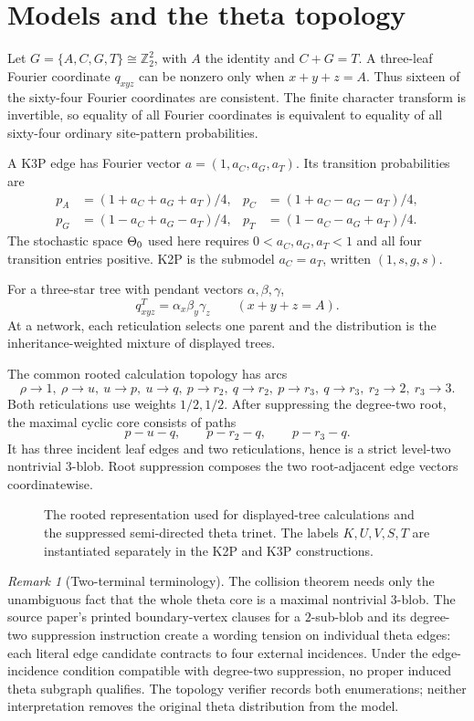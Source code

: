 \documentclass[11pt]{article}
\theoremstyle{remark}\newtheorem{remark}[theorem]{Remark}
\begin{document}
\section{Models and the theta topology}\label{sec:models}
Let $G=\{A,C,G,T\}\cong\mathbb Z_2^2$, with $A$ the identity and $C+G=T$. A three-leaf Fourier coordinate $q_{xyz}$ can be nonzero only when $x+y+z=A$. Thus sixteen of the sixty-four Fourier coordinates are consistent. The finite character transform is invertible, so equality of all Fourier coordinates is equivalent to equality of all sixty-four ordinary site-pattern probabilities.

A K3P edge has Fourier vector $a=(1,a_C,a_G,a_T)$. Its transition probabilities are
\begin{align*}
p_A&=(1+a_C+a_G+a_T)/4,&p_C&=(1+a_C-a_G-a_T)/4,\\
p_G&=(1-a_C+a_G-a_T)/4,&p_T&=(1-a_C-a_G+a_T)/4.
\end{align*}
The stochastic space $\Theta_0$ used here requires $0<a_C,a_G,a_T<1$ and all four transition entries positive. K2P is the submodel $a_C=a_T$, written $(1,s,g,s)$.

For a three-star tree with pendant vectors $\alpha,\beta,\gamma$,
\[
q^T_{xyz}=\alpha_x\beta_y\gamma_z\qquad(x+y+z=A).
\]
At a network, each reticulation selects one parent and the distribution is the inheritance-weighted mixture of displayed trees.

The common rooted calculation topology has arcs
\begin{equation}\label{eq:arcs}
\rho\to1,\ \rho\to u,\ u\to p,\ u\to q,\ p\to r_2,\ q\to r_2,\ p\to r_3,\ q\to r_3,\ r_2\to2,\ r_3\to3.
\end{equation}
Both reticulations use weights $1/2,1/2$. After suppressing the degree-two root, the maximal cyclic core consists of paths
\[
p-u-q,\qquad p-r_2-q,\qquad p-r_3-q.
\]
It has three incident leaf edges and two reticulations, hence is a strict level-two nontrivial $3$-blob. Root suppression composes the two root-adjacent edge vectors coordinatewise.
\begin{figure}[ht]
\centering\resizebox{\textwidth}{!}{}
\caption{The rooted representation used for displayed-tree calculations and the suppressed semi-directed theta trinet. The labels $K,U,V,S,T$ are instantiated separately in the K2P and K3P constructions.}
\label{fig:theta}
\end{figure}
\begin{remark}[Two-terminal terminology]
The collision theorem needs only the unambiguous fact that the whole theta core is a maximal nontrivial $3$-blob. The source paper's printed boundary-vertex clauses for a $2$-sub-blob and its degree-two suppression instruction create a wording tension on individual theta edges: each literal edge candidate contracts to four external incidences. Under the edge-incidence condition compatible with degree-two suppression, no proper induced theta subgraph qualifies. The topology verifier records both enumerations; neither interpretation removes the original theta distribution from the model.
\end{remark}
\end{document}
